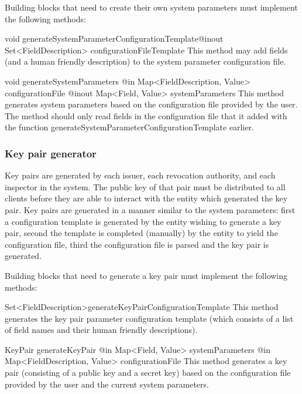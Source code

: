     Building blocks that need to create their own system parameters must implement
    the following methods:
      \begin{method}
      {void}
      {generateSystemParameterConfigurationTemplate}{{@inout Set<FieldDescription> configurationFileTemplate}}
      This method may add fields (and a human friendly description) to the system parameter configuration file.
      \end{method}
      \begin{method}
      {void}
      {generateSystemParameters}
      {
        {@in Map<FieldDescription, Value> configurationFile}
        {@inout Map<Field, Value> systemParameters}
      }
      This method generates system parameters based on the configuration file provided by the user.
      The method should only read fields in the configuration file that it added with the
      function generateSystemParameterConfigurationTemplate earlier.
      \end{method}

    \subsubsection{Key pair generator}
    \label{sec:intf:keygen}
    Key pairs are generated by each issuer, each revocation authority, and each inspector in the
    system. The public key of that pair must be distributed to all clients before they are able
    to interact with the entity which generated the key pair.
    Key pairs are generated in a manner similar to the system parameters:
    first a configuration template is generated by the entity wishing to generate a key pair,
    second the template is completed (manually) by the entity to yield the configuration file, third the
    configuration file is parsed and the key pair is generated.

    Building blocks that need to generate a key pair must implement the following methods:
      \begin{getter}{Set<FieldDescription>}{generateKeyPairConfigurationTemplate}
      This method generates the key pair parameter configuration template (which consists of a list of
      field names and their human friendly descriptions).
      \end{getter}
      \begin{method}
      {KeyPair}
      {generateKeyPair}
      {
        {@in Map<Field, Value> systemParameters}
        {@in Map<FieldDescription, Value> configurationFile}
      }
      This method generates a key pair (consisting of a public key and a secret key)
      based on the configuration file provided by the user and the
      current system parameters.
      \end{method}

